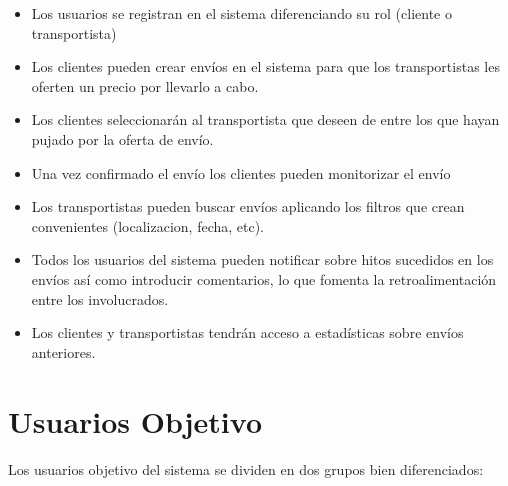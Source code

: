 \documentclass[10pt, a4paper,spanish]{article}
\begin{document}
		\begin{itemize}

			\item Los usuarios se registran en el sistema diferenciando su rol (cliente o transportista)

			\item Los clientes pueden crear envíos en el sistema para que los transportistas les oferten un precio por llevarlo a cabo.

			\item Los clientes seleccionarán al transportista que deseen de entre los que hayan pujado por la oferta de envío.

			\item Una vez confirmado el envío los clientes pueden monitorizar el envío

			\item Los transportistas pueden buscar envíos aplicando los filtros que crean convenientes (localizacion, fecha, etc).

			\item Todos los usuarios del sistema pueden notificar sobre hitos sucedidos en los envíos así como introducir comentarios, lo que fomenta la retroalimentación entre los involucrados.

			\item Los clientes y transportistas tendrán acceso a estadísticas sobre envíos anteriores.


		\end{itemize}



	\section{Usuarios Objetivo}

		\paragraph{}
		Los usuarios objetivo del sistema se dividen en dos grupos bien diferenciados:
\end{document}
